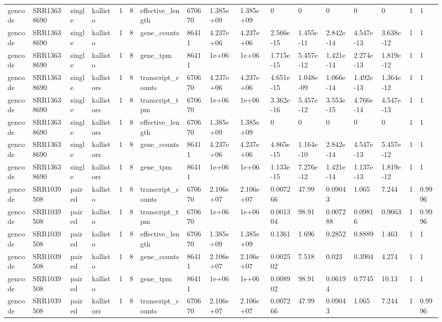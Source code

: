 \begin{tabular}{lllllllllllllllll}
gencode & SRR13638690 & single & kallisto & 1 & 8 & effective\_length & 670670 & 1.385e+09 & 1.385e+09 & 0 & 0 & 0 & 0 & 0 & 1 & 1 \\
gencode & SRR13638690 & single & kallisto & 1 & 8 & gene\_counts & 86411 & 4.237e+06 & 4.237e+06 & 2.566e-15 & 1.455e-11 & 2.842e-14 & 4.547e-13 & 3.638e-12 & 1 & 1 \\
gencode & SRR13638690 & single & kallisto & 1 & 8 & gene\_tpm & 86411 & 1e+06 & 1e+06 & 1.715e-15 & 5.457e-12 & 1.421e-14 & 2.274e-13 & 1.819e-12 & 1 & 1 \\
gencode & SRR13638690 & single & kallistors & 1 & 8 & transcript\_counts & 670670 & 4.237e+06 & 4.237e+06 & 4.651e-15 & 1.048e-09 & 1.066e-14 & 1.492e-13 & 1.364e-12 & 1 & 1 \\
gencode & SRR13638690 & single & kallistors & 1 & 8 & transcript\_tpm & 670670 & 1e+06 & 1e+06 & 3.362e-16 & 5.457e-12 & 3.553e-15 & 4.766e-14 & 4.547e-13 & 1 & 1 \\
gencode & SRR13638690 & single & kallistors & 1 & 8 & effective\_length & 670670 & 1.385e+09 & 1.385e+09 & 0 & 0 & 0 & 0 & 0 & 1 & 1 \\
gencode & SRR13638690 & single & kallistors & 1 & 8 & gene\_counts & 86411 & 4.237e+06 & 4.237e+06 & 4.865e-15 & 1.164e-10 & 2.842e-14 & 4.547e-13 & 5.457e-12 & 1 & 1 \\
gencode & SRR13638690 & single & kallistors & 1 & 8 & gene\_tpm & 86411 & 1e+06 & 1e+06 & 1.133e-15 & 7.276e-12 & 1.421e-14 & 1.137e-13 & 1.819e-12 & 1 & 1 \\
gencode & SRR1039508 & paired & kallisto & 1 & 8 & transcript\_counts & 670670 & 2.106e+07 & 2.106e+07 & 0.007266 & 47.99 & 0.09043 & 1.065 & 7.244 & 1 & 0.9996 \\
gencode & SRR1039508 & paired & kallisto & 1 & 8 & transcript\_tpm & 670670 & 1e+06 & 1e+06 & 0.001304 & 98.91 & 0.007288 & 0.09816 & 0.9663 & 1 & 0.9996 \\
gencode & SRR1039508 & paired & kallisto & 1 & 8 & effective\_length & 670670 & 1.385e+09 & 1.385e+09 & 0.1361 & 1.696 & 0.2852 & 0.8889 & 1.463 & 1 & 1 \\
gencode & SRR1039508 & paired & kallisto & 1 & 8 & gene\_counts & 86411 & 2.106e+07 & 2.106e+07 & 0.002502 & 7.518 & 0.023 & 0.3904 & 4.274 & 1 & 1 \\
gencode & SRR1039508 & paired & kallisto & 1 & 8 & gene\_tpm & 86411 & 1e+06 & 1e+06 & 0.008902 & 98.91 & 0.06194 & 0.7745 & 10.13 & 1 & 1 \\
gencode & SRR1039508 & paired & kallistors & 1 & 8 & transcript\_counts & 670670 & 2.106e+07 & 2.106e+07 & 0.007266 & 47.99 & 0.09043 & 1.065 & 7.244 & 1 & 0.9996 \\

\end{tabular}
